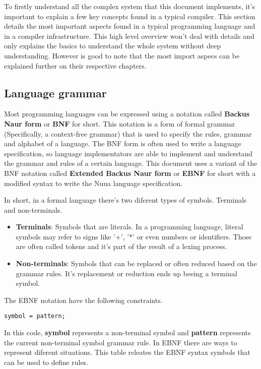 To firstly understand all the complex system that this document implements, it's important to explain a few key concepts
found in a typical compiler. This section details the most important aspects found in a typical programming language and in a compiler infrastructure.
This high level overview won't deal with details and only explains the basics to understand the whole system without deep understanding.
However is good to note that the most import aspecs can be explained further on their respective chapters.


\subsection{Language grammar}

Most programming languages can be expressed using a notation called \textbf{Backus Naur form} or \textbf{BNF} for short. This notation is a form of formal
grammar (Specifically, a context-free grammar) that is used to specify the rules, grammar and alphabet of a language. The BNF form is often used to write
a language specification, so language implementators are able to implement and understand the grammar and rules of a certain language. This
document uses a variant of the BNF notation called \textbf{Extended Backus Naur form} or \textbf{EBNF} for short with a modified syntax to
write the Nuua language specification.

In short, in a formal language there's two diferent types of symbols. Terminals and non-terminals.

\begin{itemize}
    \item \textbf{Terminals}: Symbols that are literals. In a programming language, literal symbols may refer to signs like '+', '*'
        or even numbers or identifiers. Those are often called tokens and it's part of the result of a lexing process.
    \item \textbf{Non-terminals}: Symbols that can be replaced or often reduced based on the grammar rules. It's replacement or reduction
        ends up beeing a terminal symbol.
\end{itemize}

\noindent
The EBNF notation have the following constraints.

\begin{center}
    \texttt{symbol = pattern;}
\end{center}

\noindent
In this code, \textbf{symbol} represents a non-terminal symbol and \textbf{pattern} represents the current non-terminal symbol grammar rule.
In EBNF there are ways to represent diferent situations. This table releates the EBNF syntax symbols that can be used to define rules.

